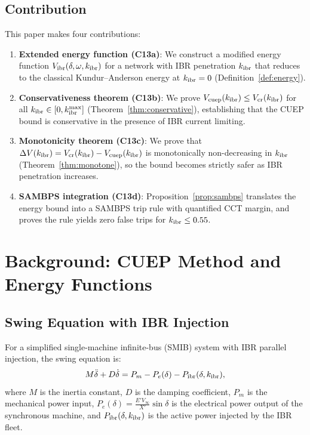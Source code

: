 \documentclass[journal]{IEEEtran}
\newcommand{\kibr}{k_{\rm ibr}}
\newcommand{\Vcuep}{V_{\rm cuep}}
\newcommand{\Vcr}{V_{\rm cr}}
\newcommand{\DeltaV}{\Delta V}
\newcommand{\Pm}{P_m}
\newcommand{\Pe}{P_e}
\begin{document}
\subsection{Contribution}

This paper makes four contributions:
\begin{enumerate}
  \item \textbf{Extended energy function (C13a)}: We construct a
        modified energy function $V_{\rm ibr}(\delta, \omega, \kibr)$
        for a network with IBR penetration $\kibr$ that reduces to
        the classical Kundur--Anderson energy at $\kibr = 0$
        (Definition~\ref{def:energy}).

  \item \textbf{Conservativeness theorem (C13b)}: We prove
        $\Vcuep(\kibr) \leq \Vcr(\kibr)$ for all $\kibr \in [0, \kibr^{\max}]$
        (Theorem~\ref{thm:conservative}), establishing that the CUEP
        bound is conservative in the presence of IBR current limiting.

  \item \textbf{Monotonicity theorem (C13c)}: We prove that
        $\DeltaV(\kibr) = \Vcr(\kibr) - \Vcuep(\kibr)$ is monotonically
        non-decreasing in $\kibr$ (Theorem~\ref{thm:monotone}), so
        the bound becomes strictly safer as IBR penetration increases.

  \item \textbf{SAMBPS integration (C13d)}: Proposition~\ref{prop:sambps}
        translates the energy bound into a SAMBPS trip rule with
        quantified CCT margin, and proves the rule yields zero false
        trips for $\kibr \leq 0.55$.
\end{enumerate}

\section{Background: CUEP Method and Energy Functions}
\label{sec:background}

\subsection{Swing Equation with IBR Injection}

For a simplified single-machine infinite-bus (SMIB) system with IBR
parallel injection, the swing equation is:
\begin{equation}
  M\ddot{\delta} + D\dot{\delta}
  = \Pm - \Pe(\delta) - P_{\rm ibr}(\delta, \kibr),
  \label{eq:swing}
\end{equation}
where $M$ is the inertia constant, $D$ is the damping coefficient,
$\Pm$ is the mechanical power input, $\Pe(\delta) = \frac{E'V_\infty}{X'}
\sin\delta$ is the electrical power output of the synchronous machine,
and $P_{\rm ibr}(\delta, \kibr)$ is the active power injected by the
IBR fleet.
\end{document}
